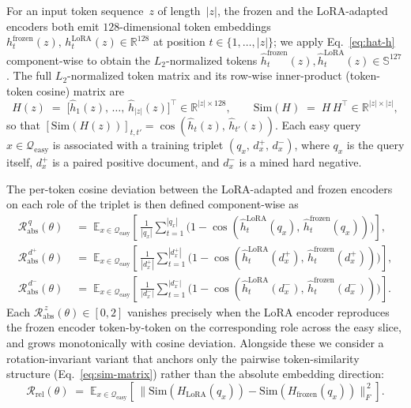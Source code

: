 For an input token sequence~$z$ of length~$|z|$, the frozen and the LoRA-adapted encoders both emit $128$-dimensional token embeddings $h_t^{\text{frozen}}(z),\, h_t^{\text{LoRA}}(z) \in \mathbb{R}^{128}$ at position $t \in \{1, \ldots, |z|\}$; we apply Eq.~\eqref{eq:hat-h} component-wise to obtain the $L_2$-normalized tokens $\hat h_t^{\text{frozen}}(z), \hat h_t^{\text{LoRA}}(z) \in \mathbb{S}^{127}$. The full $L_2$-normalized token matrix and its row-wise inner-product (token-token cosine) matrix are
\begin{equation}
H(z) \;=\; \bigl[\hat h_1(z),\, \ldots,\, \hat h_{|z|}(z)\bigr]^{\top} \in \mathbb{R}^{|z|\times 128},
\qquad
\mathrm{Sim}(H) \;=\; H\,H^{\top} \in \mathbb{R}^{|z|\times|z|},
\label{eq:sim-matrix}
\end{equation}
so that $[\mathrm{Sim}(H(z))]_{t,t'} = \cos(\hat h_t(z),\, \hat h_{t'}(z))$. Each easy query $x \in \mathcal{Q}_{\text{easy}}$ is associated with a training triplet $(q_x,\, d^+_x,\, d^-_x)$, where $q_x$ is the query itself, $d^+_x$ is a paired positive document, and $d^-_x$ is a mined hard negative.

The per-token cosine deviation between the LoRA-adapted and frozen encoders on each role of the triplet is then defined component-wise as
\begin{align}
\mathcal{R}_{\text{abs}}^{\,q}(\theta) &\;=\; \mathbb{E}_{x \in \mathcal{Q}_{\text{easy}}}\!\left[\,\frac{1}{|q_x|}\sum_{t=1}^{|q_x|}\bigl(1 - \cos(\hat h_t^{\text{LoRA}}(q_x),\, \hat h_t^{\text{frozen}}(q_x))\bigr)\right], \label{eq:anchor-q}\\
\mathcal{R}_{\text{abs}}^{\,d^+}(\theta) &\;=\; \mathbb{E}_{x \in \mathcal{Q}_{\text{easy}}}\!\left[\,\frac{1}{|d^+_x|}\sum_{t=1}^{|d^+_x|}\bigl(1 - \cos(\hat h_t^{\text{LoRA}}(d^+_x),\, \hat h_t^{\text{frozen}}(d^+_x))\bigr)\right], \label{eq:anchor-dpos}\\
\mathcal{R}_{\text{abs}}^{\,d^-}(\theta) &\;=\; \mathbb{E}_{x \in \mathcal{Q}_{\text{easy}}}\!\left[\,\frac{1}{|d^-_x|}\sum_{t=1}^{|d^-_x|}\bigl(1 - \cos(\hat h_t^{\text{LoRA}}(d^-_x),\, \hat h_t^{\text{frozen}}(d^-_x))\bigr)\right]. \label{eq:anchor-dneg}
\end{align}
Each $\mathcal{R}_{\text{abs}}^{\,z}(\theta) \in [0, 2]$ vanishes precisely when the LoRA encoder reproduces the frozen encoder token-by-token on the corresponding role across the easy slice, and grows monotonically with cosine deviation. Alongside these we consider a rotation-invariant variant that anchors only the pairwise token-similarity structure (Eq.~\eqref{eq:sim-matrix}) rather than the absolute embedding direction:
\begin{equation}
\mathcal{R}_{\text{rel}}(\theta) \;=\; \mathbb{E}_{x \in \mathcal{Q}_{\text{easy}}}\!\left[\,\bigl\|\mathrm{Sim}(H_{\text{LoRA}}(q_x)) - \mathrm{Sim}(H_{\text{frozen}}(q_x))\bigr\|_F^{\,2}\right].
\label{eq:anchor-rel}
\end{equation}

